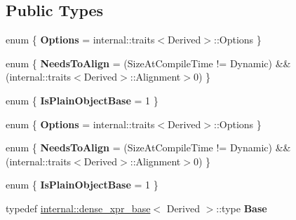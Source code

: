 \subsection*{Public Types}
\begin{DoxyCompactItemize}
\item 
\mbox{\label{class_eigen_1_1_plain_object_base_ae8dd488f74014d03cb6f61244e0c17db}} 
enum \{ {\bfseries Options} = internal\+:\+:traits$<$Derived$>$\+:\+:Options
 \}
\item 
\mbox{\label{class_eigen_1_1_plain_object_base_acfda77235252109a87bea31f1b8a333c}} 
enum \{ {\bfseries Needs\+To\+Align} = (Size\+At\+Compile\+Time != Dynamic) \&\& (internal\+:\+:traits$<$Derived$>$\+:\+:Alignment$>$0)
 \}
\item 
\mbox{\label{class_eigen_1_1_plain_object_base_a3229df866e70bff1127d51ed68b386cc}} 
enum \{ {\bfseries Is\+Plain\+Object\+Base} = 1
 \}
\item 
\mbox{\label{class_eigen_1_1_plain_object_base_a75581e170a557da41c32751c194b44b4}} 
enum \{ {\bfseries Options} = internal\+:\+:traits$<$Derived$>$\+:\+:Options
 \}
\item 
\mbox{\label{class_eigen_1_1_plain_object_base_a3beee2647ef65ff6fc374ce15c4c180c}} 
enum \{ {\bfseries Needs\+To\+Align} = (Size\+At\+Compile\+Time != Dynamic) \&\& (internal\+:\+:traits$<$Derived$>$\+:\+:Alignment$>$0)
 \}
\item 
\mbox{\label{class_eigen_1_1_plain_object_base_a0aa2419d08d778a8ae030462cde1ddf1}} 
enum \{ {\bfseries Is\+Plain\+Object\+Base} = 1
 \}
\item 
\mbox{\label{class_eigen_1_1_plain_object_base_af7336f57da064247e217e46b7a986f55}} 
typedef \hyperlink{struct_eigen_1_1internal_1_1dense__xpr__base}{internal\+::dense\+\_\+xpr\+\_\+base}$<$ Derived $>$\+::type {\bfseries Base}
\item 
\mbox{\label{class_eigen_1_1_plain_object_base_af12ddbff60960617ba01a84d361ba663}} 

\end{DoxyCompactItemize}
